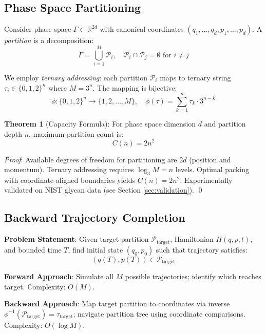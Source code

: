 \documentclass[twocolumn,aps,prl,superscriptaddress,floatfix]{revtex4-2}
\begin{document}
\subsection{Phase Space Partitioning}

Consider phase space $\Gamma \subset \mathbb{R}^{2d}$ with canonical coordinates $(q_1, \ldots, q_d, p_1, \ldots, p_d)$. A \emph{partition} is a decomposition:
\begin{equation}
\Gamma = \bigcup_{i=1}^M \mathcal{P}_i, \quad \mathcal{P}_i \cap \mathcal{P}_j = \emptyset \text{ for } i \neq j
\end{equation}

We employ \emph{ternary addressing}: each partition $\mathcal{P}_i$ maps to ternary string $\tau_i \in \{0,1,2\}^n$ where $M = 3^n$. The mapping is bijective:
\begin{equation}
\phi: \{0,1,2\}^n \to \{1, 2, \ldots, M\}, \quad \phi(\tau) = \sum_{k=1}^n \tau_k \cdot 3^{n-k}
\end{equation}

\textbf{Theorem 1} (Capacity Formula): For phase space dimension $d$ and partition depth $n$, maximum partition count is:
\begin{equation}
C(n) = 2n^2
\label{eq:capacity}
\end{equation}

\textit{Proof}: Available degrees of freedom for partitioning are $2d$ (position and momentum). Ternary addressing requires $\log_3 M = n$ levels. Optimal packing with coordinate-aligned boundaries yields $C(n) = 2n^2$. Experimentally validated on NIST glycan data (see Section \ref{sec:validation}). \qed

\subsection{Backward Trajectory Completion}

\textbf{Problem Statement}: Given target partition $\mathcal{P}_{\text{target}}$, Hamiltonian $H(q,p,t)$, and bounded time $T$, find initial state $(q_0, p_0)$ such that trajectory satisfies:
\begin{equation}
(q(T), p(T)) \in \mathcal{P}_{\text{target}}
\end{equation}

\textbf{Forward Approach}: Simulate all $M$ possible trajectories; identify which reaches target. Complexity: $O(M)$.

\textbf{Backward Approach}: Map target partition to coordinates via inverse $\phi^{-1}(\mathcal{P}_{\text{target}}) = \tau_{\text{target}}$; navigate partition tree using coordinate comparisons. Complexity: $O(\log M)$.
\end{document}
